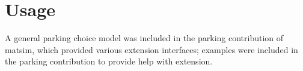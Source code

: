 \section{Usage}
A general parking choice model was included in the parking \gls{contribution} of \gls{matsim}, which provided various extension interfaces; examples were included in the parking contribution to provide help with extension. 



